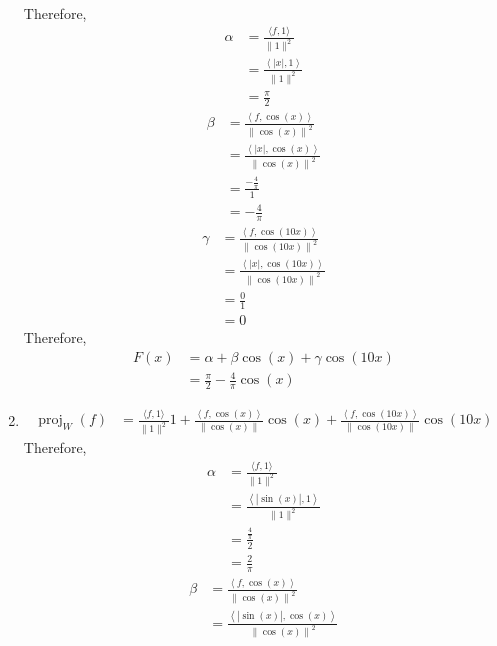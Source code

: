 \documentclass[fleqn, a4paper, 11pt, oneside]{amsart}
\theoremstyle{definition}
\theoremstyle{theorem}
\DeclareMathOperator{\proj}{proj}
\begin{document}
\begin{solution}
\begin{enumerate}
\begin{align*}
			\end{align*}
			Therefore,
			\begin{align*}
				\alpha &= \frac{\langle f,1 \rangle}{\|1\|^2}\\
				&= \frac{\left\langle |x|,1 \right\rangle}{\|1\|^2}\\
				&= \frac{\pi}{2}
			\end{align*}
			\begin{align*}
				\beta &= \frac{\left\langle f,\cos(x) \right\rangle}{\left\| \cos(x) \right\|^2}\\
				&= \frac{\left\langle |x|,\cos(x) \right\rangle}{\left\| \cos(x) \right\|^2}\\
				&= \frac{-\frac{4}{\pi}}{1}\\
				&= -\frac{4}{\pi}
			\end{align*}
			\begin{align*}
				\gamma &= \frac{\left\langle f,\cos(10 x) \right\rangle}{\left\| \cos(10 x) \right\|^2}\\
				&= \frac{\left\langle |x|,\cos(10 x) \right\rangle}{\left\| \cos(10 x) \right\|^2}\\
				&= \frac{0}{1}\\
				&= 0
			\end{align*}
			Therefore,
			\begin{align*}
				F(x) &= \alpha + \beta \cos(x) + \gamma \cos(10 x)\\
				&= \frac{\pi}{2} - \frac{4}{\pi} \cos(x)
			\end{align*}
		\item
			\begin{align*}
				\proj_{W}(f) &= \frac{\langle f,1 \rangle}{\|1\|^2} 1 + \frac{\left\langle f,\cos(x) \right\rangle}{\left\| \cos(x) \right\|} \cos(x) + \frac{\left\langle f,\cos(10 x) \right\rangle}{\left\| \cos(10 x) \right\|} \cos(10 x)
			\end{align*}
			Therefore,
			\begin{align*}
				\alpha &= \frac{\langle f,1 \rangle}{\|1\|^2}\\
				&= \frac{\left\langle \left| \sin(x) \right|,1 \right\rangle}{\|1\|^2}\\
				&= \frac{\frac{4}{\pi}}{2}\\
				&= \frac{2}{\pi}
			\end{align*}
			\begin{align*}
				\beta &= \frac{\left\langle f,\cos(x) \right\rangle}{\left\| \cos(x) \right\|^2}\\
				&= \frac{\left\langle \left| \sin(x) \right|,\cos(x) \right\rangle}{\left\| \cos(x) \right\|^2}\\

\end{align*}
\end{enumerate}
\end{solution}
\end{document}
